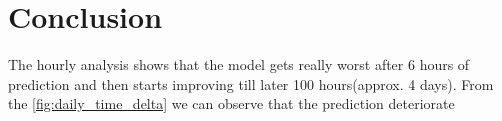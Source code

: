 \documentclass{scrartcl}
\begin{document}
\section{Conclusion} 
The hourly analysis shows that the model gets really worst after 6 hours of prediction and then starts improving till later 100 hours(approx. 4 days). From the \ref{fig:daily_time_delta} we can observe that the prediction deteriorate 










%


\end{document}
